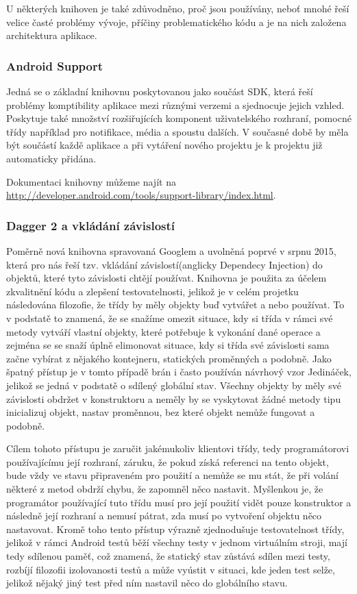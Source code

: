 \documentclass{article}
\begin{document}
U některých knihoven je také zdůvodněno, proč jsou používány,
neboť mnohé řeší velice časté problémy vývoje, příčiny problematického kódu a je na nich založena
architektura aplikace.

\subsubsection{Android Support}
Jedná se o základní knihovnu poskytovanou jako součást SDK, která řeší problémy komptibility aplikace
mezi různými verzemi a sjednocuje jejich vzhled. Poskytuje také množství rozšiřujících komponent uživatelského rozhraní,
pomocné třídy například pro notifikace, média a spoustu dalších. V současné době by měla být součástí každě
aplikace a při vytáření nového projektu je k projektu již automaticky přidána.

Dokumentaci knihovny můžeme najít na \url{http://developer.android.com/tools/support-library/index.html}.

\subsubsection{Dagger 2 a vkládání závislostí}
Poměrně nová knihovna spravovaná Googlem a uvolněná poprvé v srpnu 2015, která pro nás řeší tzv. vkládání
závislostí(anglicky Dependecy Injection) do objektů,
které tyto závislosti chtějí používat. Knihovna je použita za účelem zkvalitnění kódu a zlepšení testovatelnosti, jelikož
je v celém projetku následována filozofie, že třídy by měly objekty buď vytvářet a nebo používat. To v podstatě to znamená,
že se snažíme omezit situace, kdy si třída v rámci své metody vytváří vlastní objekty, které potřebuje k vykonání
dané operace a zejména se se snaží úplně elimonovat situace, kdy si třída své závislosti sama začne vybírat z nějakého
kontejneru, statických proměnných a podobně. Jako špatný přístup je v tomto případě brán i často používán návrhový vzor
Jedináček, jelikož se jedná v podstatě o sdílený globální stav. Všechny objekty by měly své závislosti obdržet v konstruktoru
a neměly by se vyskytovat žádné metody tipu inicializuj objekt, nastav proměnnou, bez které objekt nemůže fungovat a podobně.

Cílem tohoto přístupu je zaručit jakémukoliv klientovi třídy, tedy programátorovi používajícímu její rozhraní,
záruku, že pokud získá referenci na tento objekt, bude vždy ve stavu připraveném pro použití a nemůže se mu stát,
že při volání některé z metod obdrží chybu, že zapomněl něco nastavit. Myšlenkou je, že programátor používající
tuto třídu musí pro její použití vidět pouze konstruktor a následně její rozhraní a nemusí pátrat, zda musí po
vytvoření objektu něco nastavovat. Kromě toho tento přístup výrazně zjednodušuje testovatelnost třídy, jelikož v rámci
Android testů běží všechny testy v jednom virtuálním stroji, mají tedy sdílenou paměť, což znamená, že statický
stav zůstává sdílen mezi testy, rozbíjí filozofii izolovanosti testů a může vyústit v situaci, kde jeden test selže,
jelikož nějaký jiný test před ním nastavil něco do globálního stavu.
\end{document}

